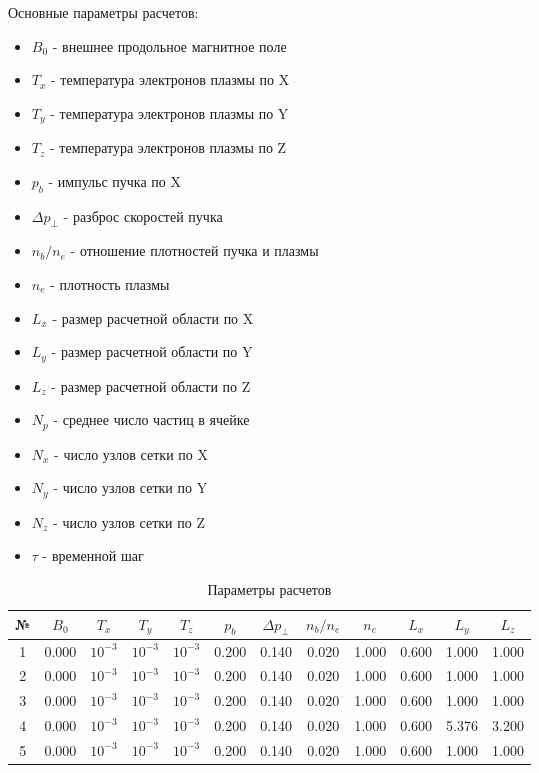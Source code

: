 \documentclass[a4paper,14pt]{extreport}
\begin{document}
Основные параметры расчетов: 
 \begin{itemize} 
\item $B_0$ - внешнее продольное магнитное поле 
\item $T_x$ - температура электронов плазмы по X 
\item $T_y$ - температура электронов плазмы по Y 
\item $T_z$ - температура электронов плазмы по Z 
\item $p_b$ - импульс пучка по X
\item $\Delta p_{\perp}$ - разброс скоростей пучка
\item $n_b/n_e$ - отношение плотностей пучка и плазмы
\item $n_e$ - плотность плазмы
\item $L_x$ - размер расчетной области по X
\item $L_y$ - размер расчетной области по Y
\item $L_z$ - размер расчетной области по Z
\item $N_p$ - среднее число частиц в ячейке
\item $N_x$ - число узлов сетки по X
\item $N_y$ - число узлов сетки по Y
\item $N_z$ - число узлов сетки по Z
\item $\tau$ - временной шаг
 \end{itemize} 

\begin{table}
\centering 
\caption{Параметры расчетов}
\label{param_table}
\begin{tabular}{|c|c|c|c|c|c|c|c|c|c|c|c|}
  \hline 
              №  &  $B_0$ & $T_x$ & $T_y$ & $T_z$ & $p_b$ & $\Delta p_{\perp}$ & $n_b/n_e$ & $n_e$ & $L_x$ & $L_y$ & $L_z$  \\ \hline 
 1 & 0.000 & $10^{-3}$ & $10^{-3}$ & $10^{-3}$ & 0.200 & 0.140 & 0.020 & 1.000 & 0.600 & 1.000 & 1.000  \\ \hline 
 2 & 0.000 & $10^{-3}$ & $10^{-3}$ & $10^{-3}$ & 0.200 & 0.140 & 0.020 & 1.000 & 0.600 & 1.000 & 1.000  \\ \hline 
 3 & 0.000 & $10^{-3}$ & $10^{-3}$ & $10^{-3}$ & 0.200 & 0.140 & 0.020 & 1.000 & 0.600 & 1.000 & 1.000  \\ \hline 
 4 & 0.000 & $10^{-3}$ & $10^{-3}$ & $10^{-3}$ & 0.200 & 0.140 & 0.020 & 1.000 & 0.600 & 5.376 & 3.200  \\ \hline 
 5 & 0.000 & $10^{-3}$ & $10^{-3}$ & $10^{-3}$ & 0.200 & 0.140 & 0.020 & 1.000 & 0.600 & 1.000 & 1.000  \\ \hline 
 
 \end{tabular} 
 \end{table}
\end{document}
